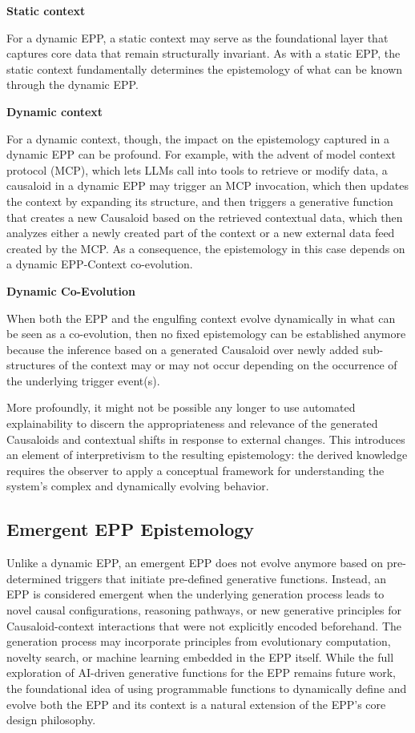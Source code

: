 \textbf{Static context}

For a dynamic EPP, a static context may serve as the foundational layer that captures core data that remain structurally invariant. As with a static EPP, the static context fundamentally determines the epistemology of what can be known through the dynamic EPP.

\textbf{Dynamic context}

For a dynamic context, though, the impact on the epistemology captured in a dynamic EPP can be profound. For example, with the advent of model context protocol (MCP), which lets LLMs call into tools to retrieve or modify data, a causaloid in a dynamic EPP may trigger an MCP invocation, which then updates the context by expanding its structure, and then triggers a generative function that creates a new Causaloid based on the retrieved contextual data, which then analyzes either a newly created part of the context or a new external data feed created by the MCP. As a consequence, the epistemology in this case depends on a dynamic EPP-Context co-evolution.

\textbf{Dynamic Co-Evolution}

When both the EPP and the engulfing context evolve dynamically in what can be seen as a co-evolution, then no fixed epistemology can be established anymore because the inference based on a generated Causaloid over newly added sub-structures of the context may or may not occur depending on the occurrence of the underlying trigger event(s).

More profoundly, it might not be possible any longer to use automated explainability to discern the appropriateness and relevance of the generated Causaloids and contextual shifts in response to external changes. This introduces an element of interpretivism to the resulting epistemology: the derived knowledge requires the observer to apply a conceptual framework for understanding the system's complex and dynamically evolving behavior.

\subsection{Emergent EPP Epistemology}

Unlike a dynamic EPP, an emergent EPP does not evolve anymore based on pre-determined triggers that initiate pre-defined generative functions. Instead, an EPP is considered emergent when the underlying generation process leads to novel causal configurations, reasoning pathways, or new generative principles for Causaloid-context interactions that were not explicitly encoded beforehand.
The generation process may incorporate principles from evolutionary computation, novelty search, or machine learning embedded in the EPP itself. While the full exploration of AI-driven generative functions for the EPP remains future work, the foundational idea of using programmable functions to dynamically define and evolve both the EPP and its context is a natural extension of the EPP's core design philosophy.

